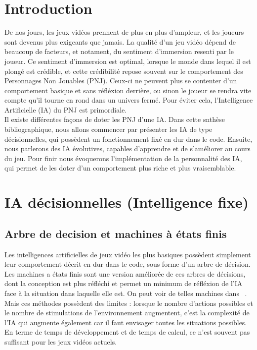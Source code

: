 \documentclass[asi]{picINSA}
\begin{document}
	
	\couverture{}

\tableofcontents{}

\chapter{Introduction}
De nos jours, les jeux vidéos prennent de plus en plus d'ampleur, et les joueurs sont devenus plus exigeants que jamais. La qualité d'un jeu vidéo dépend de beaucoup de facteurs, et notament, du sentiment d'immersion resenti par le joueur. Ce sentiment d'immersion est optimal, lorsque le monde dans lequel il est plongé est crédible, et cette crédibilité repose souvent sur le comportement des Personnages Non Jouables (PNJ). Ceux-ci ne peuvent plus se contenter d'un comportement basique et sans réfléxion derrière, ou sinon le joueur se rendra vite compte qu'il tourne en rond dans un univers fermé. Pour éviter cela, l'Intelligence Artificielle (IA) du PNJ est primordiale. \\
Il existe différentes façons de doter les PNJ d'une IA. Dans cette snthèse bibliographique, nous allons commencer par présenter les IA de type décisionnelles, qui possèdent un fonctionnement fixé en dur dans le code. Ensuite, nous parlerons des IA évolutives, capables d'apprendre et de s'améliorer au cours du jeu. Pour finir nous évoquerons l'implémentation de la personnalité des IA, qui permet de les doter d'un comportement plus riche et plus vraisemblable.


\chapter{IA décisionnelles (Intelligence fixe)}
\section{Arbre de decision et machines à états finis}
Les intelligences artificielles de jeux vidéo les plus basiques possèdent simplement leur comportement décrit en dur dans le code, sous forme d’un arbre de décision. \\
Les machines a états finis sont une version améliorée de ces arbres de décisions, dont la conception est plus réfléchi et permet un minimum de réfléxion de l'IA face à la situation dans laquelle elle est. On peut voir de telles machines dans  ~\cite{khoo2002applying}. \\
Mais ces méthodes possèdent des limites : lorsque le nombre d’actions possibles et le nombre de stimulations de l’environnement augmentent, c’est la complexité de l’IA qui augmente également car il faut envisager toutes les situations possibles. En terme de temps de développement et de temps de calcul, ce n'est souvent pas suffisant pour les jeux vidéos actuels.
\end{document}
